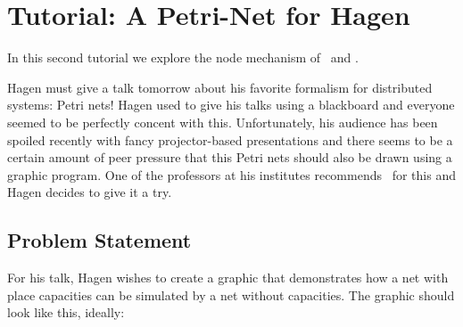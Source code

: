 \section{Tutorial: A Petri-Net for Hagen}

In this second tutorial we explore the node mechanism of
\tikzname\ and \pgfname.

Hagen must give a talk tomorrow about his favorite formalism for
distributed systems: Petri nets! Hagen used to give his talks using a
blackboard and everyone seemed to be perfectly concent with
this. Unfortunately, his audience has been spoiled recently with fancy
projector-based presentations and there seems to be a certain amount
of peer pressure that this Petri nets should also be drawn using a
graphic program. One of the professors at his institutes recommends
\tikzname\ for this and Hagen decides to give it a try.


\subsection{Problem Statement}

For his talk, Hagen wishes to create a graphic that demonstrates how a
net with place capacities can be simulated by a net without
capacities. The graphic should look like this, ideally:

